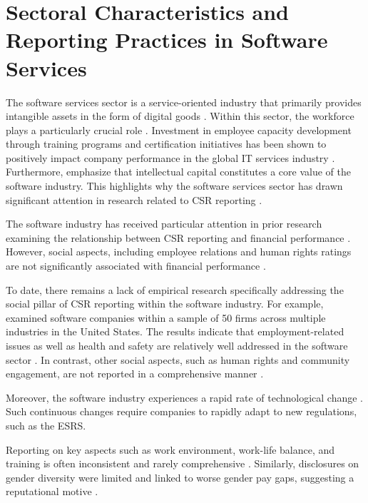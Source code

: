 \section{Sectoral Characteristics and Reporting Practices in Software Services}

The software services sector is a service-oriented industry that primarily provides intangible assets 
in the form of digital goods \parencite{Buxmann2015}. Within this sector, the workforce plays a particularly 
crucial role \parencite{Buxmann2015}. Investment in employee capacity development through training programs 
and certification initiatives has been shown to positively impact company performance in the global IT 
services industry \parencite{Chatterjee2017}. Furthermore, \textcite{Nowak2000} emphasize that intellectual 
capital constitutes a core value of the software industry. This highlights why the software services sector 
has drawn significant attention in research related to CSR reporting \parencite{Holder-Webb2009}.

The software industry has received particular attention in prior research examining the relationship 
between CSR reporting and financial performance \parencite{Okafor2021}.
However, social aspects, including employee relations and human rights ratings are not significantly associated 
with financial performance \parencite{Okafor2021}.

To date, there remains a lack of empirical research specifically addressing the social pillar of CSR reporting 
within the software industry. For example, \textcite{Holder-Webb2009} examined software companies within a sample 
of 50 firms across multiple industries in the United States. The results indicate that employment-related issues 
as well as health and safety are relatively well addressed in the software sector \parencite{Holder-Webb2009}. 
In contrast, other social aspects, such as human rights and community engagement, are not reported in a 
comprehensive manner \parencite{Holder-Webb2009}.

Moreover, the software industry experiences a rapid rate of technological change \parencite{Li2010}.
Such continuous changes require companies to rapidly adapt to new regulations, such as the ESRS. 

Reporting on key aspects such as work environment, work-life balance, 
and training is often inconsistent and rarely comprehensive \parencite{Greig2021}. Similarly,
disclosures on gender diversity were limited and linked to worse gender pay gaps,
suggesting a reputational motive \parencite{Huang2022}.


